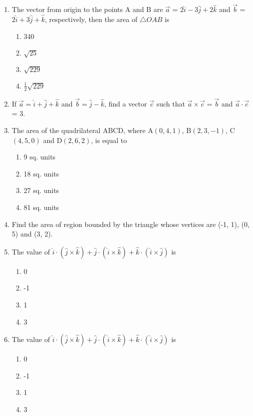 \begin{enumerate}[label=\thesubsection.\arabic*,ref=\thesubsection.\theenumi]
\item The vector from origin to the points A and B are $\vec{a}$ = $2\hat{i}-3\hat{j}+2\hat{k}$ and  $\vec{b}$ = $2\hat{i}+3\hat{j}+\hat{k}$, respectively, then the area of $\triangle {OAB}$ is
	\begin{enumerate}
\item 340 
\item $\sqrt{25}$
\item $\sqrt{229}$
\item $\frac{1}{2}\sqrt{229}$
\end{enumerate}
\item If $\vec{a} = \hat{i}+\hat{j}+\hat{k}$ and $\vec{b} = \hat{j}-\hat{k}$, find a vector $\vec{c}$ such that $\vec{a}\times\vec{c} = \vec{b}$ and $\vec{a}\cdot \vec{c}$ = 3.
%
\item The area of the quadrilateral ABCD, where A$(0,4,1)$, B$(2,3,-1)$, C$(4,5,0)$ and D$(2,6,2)$, is equal to 
\begin{enumerate}
	\item 9 sq. units
	\item 18 sq. units 
	\item 27 sq. units 
	\item 81 sq. units
\end{enumerate}
\item Find the area of region bounded by the triangle whose vertices are (-1, 1), (0, 5) and (3, 2).
\item The value of $\hat{i}\cdot(\hat{j}\times\hat{k})+\hat{j}\cdot(\hat{i}\times\hat{k})+\hat{k}\cdot(\hat{i}\times\hat{j})$ is
\begin{enumerate}
\item 0
\item -1
\item 1
\item 3
\end{enumerate}
\item The value of $\hat{i}\cdot (\hat{j}\times\hat{k})+\hat{j}\cdot (\hat{i}\times\hat{k})+\hat{k}\cdot (\hat{i}\times\hat{j})$ is
\begin{enumerate}
\item 0
\item -1
\item 1
\item 3
\end{enumerate}
\end{enumerate}

